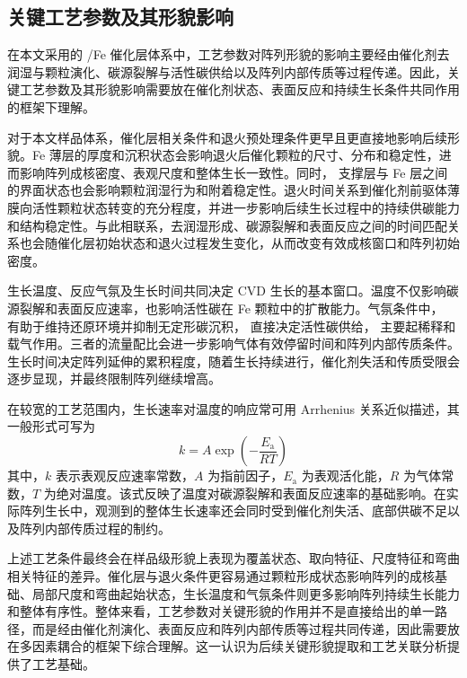 \subsection{关键工艺参数及其形貌影响}

在本文采用的 /Fe 催化层体系中，工艺参数对阵列形貌的影响主要经由催化剂去润湿与颗粒演化、碳源裂解与活性碳供给以及阵列内部传质等过程传递\cite{Szabo2017,Liu2021EcoMat}。因此，关键工艺参数及其形貌影响需要放在催化剂状态、表面反应和持续生长条件共同作用的框架下理解。

对于本文样品体系，催化层相关条件和退火预处理条件更早且更直接地影响后续形貌。Fe 薄层的厚度和沉积状态会影响退火后催化颗粒的尺寸、分布和稳定性，进而影响阵列成核密度、表观尺度和整体生长一致性\cite{Yang2016ALDThicknessCN}。同时， 支撑层与 Fe 层之间的界面状态也会影响颗粒润湿行为和附着稳定性\cite{Zhang2017BufferLayer}。退火时间关系到催化剂前驱体薄膜向活性颗粒状态转变的充分程度，并进一步影响后续生长过程中的持续供碳能力和结构稳定性。与此相联系，去润湿形成、碳源裂解和表面反应之间的时间匹配关系也会随催化层初始状态和退火过程发生变化，从而改变有效成核窗口和阵列初始密度\cite{Lee2019CatalystDewetting}。

生长温度、反应气氛及生长时间共同决定 CVD 生长的基本窗口。温度不仅影响碳源裂解和表面反应速率，也影响活性碳在 Fe 颗粒中的扩散能力。气氛条件中， 有助于维持还原环境并抑制无定形碳沉积， 直接决定活性碳供给， 主要起稀释和载气作用。三者的流量配比会进一步影响气体有效停留时间和阵列内部传质条件\cite{Hata2004,Liu2021EcoMat}。生长时间决定阵列延伸的累积程度，随着生长持续进行，催化剂失活和传质受限会逐步显现，并最终限制阵列继续增高\cite{Bulyarskiy2020}。

在较宽的工艺范围内，生长速率对温度的响应常可用 Arrhenius 关系近似描述，其一般形式可写为\cite{Liu2021EcoMat}
\begin{equation}
    k = A \exp\left(-\frac{E_{\mathrm{a}}}{RT}\right)
\end{equation}
其中，$k$ 表示表观反应速率常数，$A$ 为指前因子，$E_{\mathrm{a}}$ 为表观活化能，$R$ 为气体常数，$T$ 为绝对温度。该式反映了温度对碳源裂解和表面反应速率的基础影响。在实际阵列生长中，观测到的整体生长速率还会同时受到催化剂失活、底部供碳不足以及阵列内部传质过程的制约\cite{Bulyarskiy2020}。

上述工艺条件最终会在样品级形貌上表现为覆盖状态、取向特征、尺度特征和弯曲相关特征的差异。催化层与退火条件更容易通过颗粒形成状态影响阵列的成核基础、局部尺度和弯曲起始状态，生长温度和气氛条件则更多影响阵列持续生长能力和整体有序性\cite{Liu2021EcoMat,Zhang2009Morphology}。整体来看，工艺参数对关键形貌的作用并不是直接给出的单一路径，而是经由催化剂演化、表面反应和阵列内部传质等过程共同传递，因此需要放在多因素耦合的框架下综合理解\cite{Bulyarskiy2020}。这一认识为后续关键形貌提取和工艺关联分析提供了工艺基础。

